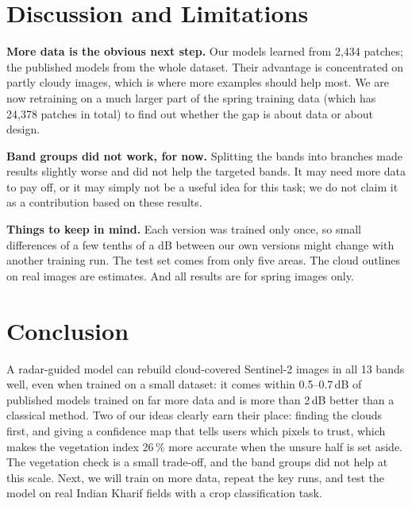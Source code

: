 \documentclass[conference]{IEEEtran}
\begin{document}
\section{Discussion and Limitations}
\textbf{More data is the obvious next step.} Our models learned from 2,434 patches; the published
models from the whole dataset. Their advantage is concentrated on partly cloudy images, which is
where more examples should help most. We are now retraining on a much larger part of the spring
training data (which has 24,378 patches in total) to find out whether the gap is about data or
about design.

\textbf{Band groups did not work, for now.} Splitting the bands into branches made results slightly
worse and did not help the targeted bands. It may need more data to pay off, or it may simply not
be a useful idea for this task; we do not claim it as a contribution based on these results.

\textbf{Things to keep in mind.} Each version was trained only once, so small differences of a few
tenths of a dB between our own versions might change with another training run. The test set
comes from only five areas. The cloud outlines on real images are estimates. And all results are
for spring images only.

\section{Conclusion}
A radar-guided model can rebuild cloud-covered Sentinel-2 images in all 13 bands well, even when
trained on a small dataset: it comes within 0.5--0.7\,dB of published models trained on far more
data and is more than 2\,dB better than a classical method. Two of our ideas clearly earn their
place: finding the clouds first, and giving a confidence map that tells users which pixels to
trust, which makes the vegetation index 26\,\% more accurate when the unsure half is set aside.
The vegetation check is a small trade-off, and the band groups did not help at this scale. Next,
we will train on more data, repeat the key runs, and test the model on real Indian Kharif fields
with a crop classification task.
\end{document}
